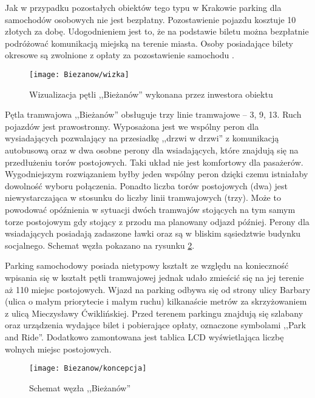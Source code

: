 \documentclass[twoside,12pt]{article}
\begin{document}
	Jak w przypadku pozostałych obiektów tego typu w Krakowie parking dla samochodów osobowych nie jest bezpłatny. Pozostawienie pojazdu kosztuje 10 złotych za dobę. Udogodnieniem jest to, że na podstawie biletu można bezpłatnie podróżować komunikacją miejską na terenie miasta. Osoby posiadające bilety okresowe są zwolnione z opłaty za pozostawienie samochodu \cite{biezanow1}.
	
	\begin{figure}[H]
		\centering
		\texttt{[image: Biezanow/wizka]}\\
		\caption{Wizualizacja pętli ,,Bieżanów'' wykonana przez inwestora obiektu}
		\label{biezanow1}
	\end{figure}	
	
	Pętla tramwajowa ,,Bieżanów'' obsługuje trzy linie tramwajowe -- 3, 9, 13. Ruch pojazdów jest prawostronny. Wyposażona jest we wspólny peron dla wysiadających pozwalający na przesiadkę ,,drzwi w drzwi'' z komunikacją autobusową oraz w dwa osobne perony dla wsiadających, które znajdują się na przedłużeniu torów postojowych. Taki układ nie jest komfortowy dla pasażerów. Wygodniejszym rozwiązaniem byłby jeden wspólny peron dzięki czemu istniałaby dowolność wyboru połączenia. Ponadto liczba torów postojowych (dwa) jest niewystarczająca w stosunku do liczby linii tramwajowych (trzy). Może to powodować opóźnienia w sytuacji dwóch tramwajów stojących na tym samym torze postojowym gdy stojący z przodu ma planowany odjazd później. Perony dla wsiadających posiadają zadaszone ławki oraz są w bliskim sąsiedztwie budynku socjalnego. Schemat węzła pokazano na rysunku \ref{biezanow2}.
	
	Parking samochodowy posiada nietypowy kształt ze względu na konieczność wpisania się w kształt pętli tramwajowej jednak udało zmieścić się na jej terenie aż 110 miejsc postojowych. Wjazd na parking odbywa się od strony ulicy Barbary (ulica o małym priorytecie i małym ruchu) kilkanaście metrów za skrzyżowaniem z ulicą Mieczysławy Ćwiklińskiej. Przed terenem parkingu znajdują się szlabany oraz urządzenia wydające bilet i pobierające opłaty, oznaczone symbolami ,,Park and Ride''. Dodatkowo zamontowana jest tablica LCD wyświetlająca liczbę wolnych miejsc postojowych. 
	
	\begin{figure}[H]
		\centering
		\texttt{[image: Biezanow/koncepcja]}\\
		\caption{Schemat węzła ,,Bieżanów''}
		\label{biezanow2}
	\end{figure}		
	
\end{document}
